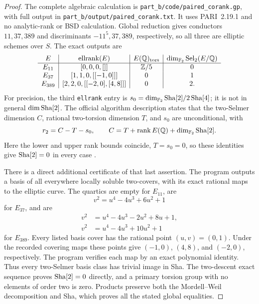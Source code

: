 \begin{proof}
The complete algebraic calculation is
\texttt{part\_b/code/paired\_corank.gp}, with full output in
\texttt{part\_b/output/paired\_corank.txt}.  It uses PARI~2.19.1
and no analytic-rank or BSD calculation.  Global reduction gives
conductors \(11,37,389\) and discriminants \(-11^5,37,389\),
respectively, so all three are elliptic schemes over \(S\).
The exact outputs are
\[
\begin{array}{c|c|c|c}
 E&\operatorname{ellrank}(E)&E(\mathbb Q)_{\rm tors}&
             \dim_{\mathbb F_2}\operatorname{Sel}_2(E/\mathbb Q)\\ \hline
 E_{11}&[0,0,0,[]]&\mathbb Z/5&0\\
 E_{37}&[1,1,0,[[-1,0]]]&0&1\\
 E_{389}&[2,2,0,[[-2,0],[4,8]]]&0&2.
\end{array}
\]
For precision, the third \texttt{ellrank} entry is
\(s_0=\dim_{\mathbb F_2}\mathop{\mathrm{Sha}}[2]/2\mathop{\mathrm{Sha}}[4]\); it is not in
general \(\dim\mathop{\mathrm{Sha}}[2]\).  The official algorithm description
states that the two-Selmer dimension \(C\), rational two-torsion
dimension \(T\), and \(s_0\) are unconditional, with
\[
 r_2=C-T-s_0,\qquad
 C=T+\operatorname{rank}E(\mathbb Q)+\dim_{\mathbb F_2}\mathop{\mathrm{Sha}}[2].
\]
Here the lower and upper rank bounds coincide, \(T=s_0=0\),
so these identities give \(\mathop{\mathrm{Sha}}[2]=0\) in every case
\citep[entries \texttt{ellrank} and \texttt{ell2cover}]{BPari2026}.

There is a direct additional certificate of that last assertion.
The program outputs a basis of all everywhere locally soluble
two-covers, with its exact rational maps to the elliptic curve.
The quartics are empty for \(E_{11}\), are
\[
       v^2=u^4-4u^3+6u^2+1
\]
for \(E_{37}\), and are
\[
\begin{aligned}
 v^2&=u^4-4u^3-2u^2+8u+1,\\
 v^2&=u^4-4u^3+10u^2+1
\end{aligned}
\]
for \(E_{389}\).  Every listed basis cover has the rational
point \((u,v)=(0,1)\).  Under the recorded covering maps these
points give \((-1,0)\), \((4,8)\), and \((-2,0)\), respectively.
The program verifies each map by an exact polynomial identity.
Thus every two-Selmer basis class has trivial image in Sha.
The two-descent exact sequence proves \(\mathop{\mathrm{Sha}}[2]=0\) directly,
and a primary torsion group with no elements of order two is zero.
Products preserve both the Mordell--Weil decomposition and Sha,
which proves all the stated global equalities.


\end{proof}
